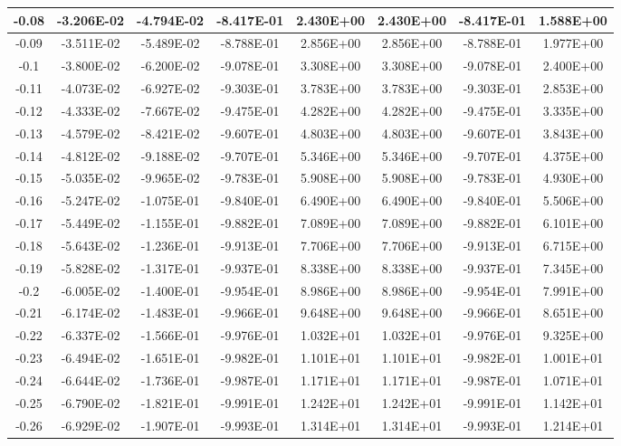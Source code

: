 \documentclass{article}
\begin{document}
\begin{center}
\begin{longtable}{|c|c|c|c|c|c|c|c|}
-0.08 & -3.206E-02 & -4.794E-02 & -8.417E-01 & 2.430E+00 & 2.430E+00 & -8.417E-01 & 1.588E+00 \\ \hline
-0.09 & -3.511E-02 & -5.489E-02 & -8.788E-01 & 2.856E+00 & 2.856E+00 & -8.788E-01 & 1.977E+00 \\ \hline
-0.1 & -3.800E-02 & -6.200E-02 & -9.078E-01 & 3.308E+00 & 3.308E+00 & -9.078E-01 & 2.400E+00 \\ \hline
-0.11 & -4.073E-02 & -6.927E-02 & -9.303E-01 & 3.783E+00 & 3.783E+00 & -9.303E-01 & 2.853E+00 \\ \hline
-0.12 & -4.333E-02 & -7.667E-02 & -9.475E-01 & 4.282E+00 & 4.282E+00 & -9.475E-01 & 3.335E+00 \\ \hline
-0.13 & -4.579E-02 & -8.421E-02 & -9.607E-01 & 4.803E+00 & 4.803E+00 & -9.607E-01 & 3.843E+00 \\ \hline
-0.14 & -4.812E-02 & -9.188E-02 & -9.707E-01 & 5.346E+00 & 5.346E+00 & -9.707E-01 & 4.375E+00 \\ \hline
-0.15 & -5.035E-02 & -9.965E-02 & -9.783E-01 & 5.908E+00 & 5.908E+00 & -9.783E-01 & 4.930E+00 \\ \hline
-0.16 & -5.247E-02 & -1.075E-01 & -9.840E-01 & 6.490E+00 & 6.490E+00 & -9.840E-01 & 5.506E+00 \\ \hline
-0.17 & -5.449E-02 & -1.155E-01 & -9.882E-01 & 7.089E+00 & 7.089E+00 & -9.882E-01 & 6.101E+00 \\ \hline
-0.18 & -5.643E-02 & -1.236E-01 & -9.913E-01 & 7.706E+00 & 7.706E+00 & -9.913E-01 & 6.715E+00 \\ \hline
-0.19 & -5.828E-02 & -1.317E-01 & -9.937E-01 & 8.338E+00 & 8.338E+00 & -9.937E-01 & 7.345E+00 \\ \hline
-0.2 & -6.005E-02 & -1.400E-01 & -9.954E-01 & 8.986E+00 & 8.986E+00 & -9.954E-01 & 7.991E+00 \\ \hline
-0.21 & -6.174E-02 & -1.483E-01 & -9.966E-01 & 9.648E+00 & 9.648E+00 & -9.966E-01 & 8.651E+00 \\ \hline
-0.22 & -6.337E-02 & -1.566E-01 & -9.976E-01 & 1.032E+01 & 1.032E+01 & -9.976E-01 & 9.325E+00 \\ \hline
-0.23 & -6.494E-02 & -1.651E-01 & -9.982E-01 & 1.101E+01 & 1.101E+01 & -9.982E-01 & 1.001E+01 \\ \hline
-0.24 & -6.644E-02 & -1.736E-01 & -9.987E-01 & 1.171E+01 & 1.171E+01 & -9.987E-01 & 1.071E+01 \\ \hline
-0.25 & -6.790E-02 & -1.821E-01 & -9.991E-01 & 1.242E+01 & 1.242E+01 & -9.991E-01 & 1.142E+01 \\ \hline
-0.26 & -6.929E-02 & -1.907E-01 & -9.993E-01 & 1.314E+01 & 1.314E+01 & -9.993E-01 & 1.214E+01 \\ \hline

\end{longtable}
\end{center}
\end{document}

